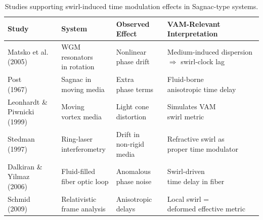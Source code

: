 \documentclass[a4paper, aps,preprint,superscriptaddress, 12pt]{revtex4}
\renewcommand{\arraystretch}{1.5}
\begin{document}
\begin{table}[H]
    \centering
    \footnotesize
    \renewcommand{\arraystretch}{1.3}
    \begin{tabular}{|l|l|l|l|}
        \hline
        \textbf{Study} & \textbf{System} & \textbf{Observed Effect} & \textbf{VAM-Relevant Interpretation} \\
        \hline
        \makecell[l]{Matsko et al. \\ (2005) \cite{matsko2005}} &
        \makecell[l]{WGM resonators \\ in rotation} &
        \makecell[l]{Nonlinear \\ phase drift} &
        \makecell[l]{Medium-induced dispersion \\ $\Rightarrow$ swirl-clock lag} \\
        \hline
        \makecell[l]{Post \\ (1967) \cite{post1967}} &
        \makecell[l]{Sagnac in \\ moving media} &
        \makecell[l]{Extra \\ phase terms} &
        \makecell[l]{Fluid-borne \\ anisotropic time delay} \\
        \hline
        \makecell[l]{Leonhardt \& Piwnicki \\ (1999) \cite{leonhardt1999}} &
        \makecell[l]{Moving \\ vortex media} &
        \makecell[l]{Light cone \\ distortion} &
        \makecell[l]{Simulates VAM \\ swirl metric} \\
        \hline
        \makecell[l]{Stedman \\ (1997) \cite{stedman1997}} &
        \makecell[l]{Ring-laser \\ interferometry} &
        \makecell[l]{Drift in \\ non-rigid media} &
        \makecell[l]{Refractive swirl as \\ proper time modulator} \\
        \hline
        \makecell[l]{Dalkiran \& Yilmaz \\ (2006) \cite{dalkiran2006}} &
        \makecell[l]{Fluid-filled \\ fiber optic loop} &
        \makecell[l]{Anomalous \\ phase noise} &
        \makecell[l]{Swirl-driven \\ time delay in fiber} \\
        \hline
        \makecell[l]{Schmid \\ (2009) \cite{schmid2009}} &
        \makecell[l]{Relativistic \\ frame analysis} &
        \makecell[l]{Anisotropic \\ delays} &
        \makecell[l]{Local swirl = \\ deformed effective metric} \\
        \hline
    \end{tabular}
    \caption{Studies supporting swirl-induced time modulation effects in Sagnac-type systems.}
    \label{tab:sagnac-swirl}
\end{table}
\end{document}
